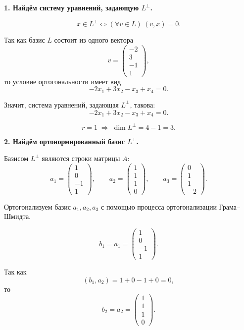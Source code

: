 \bigskip

\textbf{1. Найдём систему уравнений, задающую $L^\perp$.}

\[
x\in L^\perp
\iff
(\forall v\in L)\ (v,x)=0.
\]

Так как базис $L$ состоит из одного вектора
\[
v=
\begin{pmatrix}
-2\\
3\\
-1\\
1
\end{pmatrix},
\]
то условие ортогональности имеет вид
\[
-2x_1+3x_2-x_3+x_4=0.
\]

Значит, система уравнений, задающая $L^\perp$, такова:
\[
{-2x_1+3x_2-x_3+x_4=0.}
\]

\[
r=1 \;\Rightarrow\; \dim L^\perp = 4-1=3.
\]

\newpage

\textbf{2. Найдём ортонормированный базис $L^\perp$.}

Базисом $L^\perp$ являются строки матрицы $A$:
\[
a_1=
\begin{pmatrix}
1\\
0\\
-1\\
1
\end{pmatrix},
\qquad
a_2=
\begin{pmatrix}
1\\
1\\
1\\
0
\end{pmatrix},
\qquad
a_3=
\begin{pmatrix}
0\\
1\\
1\\
-2
\end{pmatrix}.
\]

Ортогонализуем базис $a_1,a_2,a_3$ с помощью процесса ортогонализации Грама--Шмидта.

\[
b_1=a_1=
\begin{pmatrix}
1\\
0\\
-1\\
1
\end{pmatrix}.
\]

Так как
\[
(b_1,a_2)=1+0-1+0=0,
\]
то
\[
b_2=a_2=
\begin{pmatrix}
1\\
1\\
1\\
0
\end{pmatrix}.
\]

